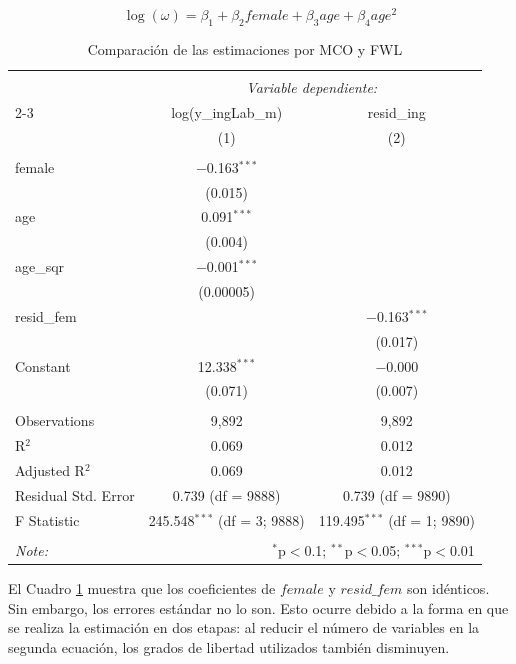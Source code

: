 \documentclass[12pt,a4paper,onecolumn]{article}
\begin{document}
\begin{equation}
\log(\omega) = \beta_1 + \beta_2 female + \beta_3 age + \beta_4 age^2
\label{eq_age}
\end{equation}
\begin{table}[!htbp] 
\centering 
\caption{Comparación de las estimaciones por MCO y FWL} 
\label{cuadro_FWL} 
\scriptsize   %
\begin{tabular}{@{\extracolsep{5pt}}lcc} 
\\[-1.8ex]\hline 
\hline \\[-1.8ex] 
 & \multicolumn{2}{c}{\textit{Variable dependiente:}} \\ 
\cline{2-3} 
 & log(y\_ingLab\_m) & resid\_ing \\ 
 & (1) & (2)\\ 
\hline \\[-1.8ex] 
 female & $-$0.163$^{***}$ &  \\ 
  & (0.015) &  \\ 
 age & 0.091$^{***}$ &  \\ 
  & (0.004) &  \\ 
 age\_sqr & $-$0.001$^{***}$ &  \\ 
  & (0.00005) &  \\ 
 resid\_fem &  & $-$0.163$^{***}$ \\ 
  &  & (0.017) \\ 
 Constant & 12.338$^{***}$ & $-$0.000 \\ 
  & (0.071) & (0.007) \\ 
\hline \\[-1.8ex] 
Observations & 9,892 & 9,892 \\ 
R$^{2}$ & 0.069 & 0.012 \\ 
Adjusted R$^{2}$ & 0.069 & 0.012 \\ 
Residual Std. Error & 0.739 (df = 9888) & 0.739 (df = 9890) \\ 
F Statistic & 245.548$^{***}$ (df = 3; 9888) & 119.495$^{***}$ (df = 1; 9890) \\ 
\hline 
\hline \\[-1.8ex] 
\textit{Note:}  & \multicolumn{2}{r}{$^{*}$p$<$0.1; $^{**}$p$<$0.05; $^{***}$p$<$0.01} \\ 
\end{tabular} 
\end{table}

El Cuadro \ref{cuadro_FWL} muestra que los coeficientes de $female$ y $resid\_fem$ son idénticos. 
Sin embargo, los errores estándar no lo son. 
Esto ocurre debido a la forma en que se realiza la estimación en dos etapas: al reducir el número de variables en la segunda ecuación, los grados de libertad utilizados también disminuyen.\\ 
\end{document}
